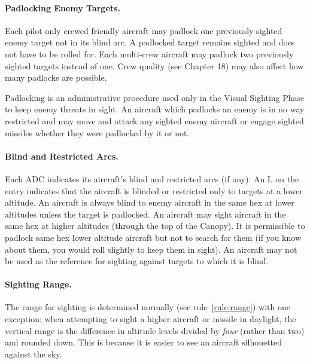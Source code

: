 {\paragraph{Padlocking Enemy Targets.} Each pilot only crewed friendly aircraft may padlock one previously sighted enemy target not in its blind arc. A padlocked target remains sighted and does not have to be rolled for. Each multi-crew aircraft may padlock two previously sighted targets instead of one. Crew quality (see Chapter 18) may also affect how many padlocks are possible.

Padlocking is an administrative procedure used only in the Visual Sighting Phase to keep enemy threats in sight. An aircraft which padlocks an enemy is in no way restricted and may move and attack any sighted enemy aircraft or engage sighted missiles whether they were padlocked by it or not. 

\paragraph{Blind and Restricted Arcs.} Each ADC indicates its aircraft's blind and restricted arcs (if any). An L on the entry indicates that the aircraft is blinded or restricted only to targets at a lower altitude. An aircraft is always blind to enemy aircraft in the same hex at lower altitudes unless the target is padlocked. An aircraft may sight aircraft in the same hex at higher altitudes (through the top of the Canopy). It is permissible to padlock same hex lower altitude aircraft but not to search for them (if you know about them, you would roll slightly to keep them in sight). An aircraft may not be used as the reference for sighting against targets to which it is blind.


}{

\paragraph{Sighting Range.} The range for sighting is determined normally (see rule~\ref{rule:range}) with one exception: when attempting to sight a higher aircraft or missile in daylight, the vertical range is the difference in altitude levels divided by \emph{four} (rather than two) and rounded down. This is because it is easier to see an aircraft silhouetted against the sky.

}
